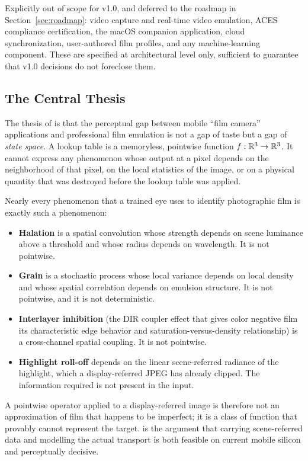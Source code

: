 Explicitly out of scope for v1.0, and deferred to the roadmap in
Section~\ref{sec:roadmap}: video capture and real-time video emulation, ACES
compliance certification, the macOS companion application, cloud
synchronization, user-authored film profiles, and any machine-learning
component. These are specified at architectural level only, sufficient to
guarantee that v1.0 decisions do not foreclose them.

\subsection{The Central Thesis}
\label{sec:intro-thesis}

The thesis of \EM{} is that the perceptual gap between mobile ``film camera''
applications and professional film emulation is not a gap of taste but a gap of
\emph{state space}. A lookup table is a memoryless, pointwise function
$f:\mathbb{R}^3 \to \mathbb{R}^3$. It cannot express any phenomenon whose output at a
pixel depends on the neighborhood of that pixel, on the local statistics of the
image, or on a physical quantity that was destroyed before the lookup table was
applied.

Nearly every phenomenon that a trained eye uses to identify photographic film
is exactly such a phenomenon:

\begin{itemize}
\item \textbf{Halation} is a spatial convolution whose strength depends on
scene luminance above a threshold and whose radius depends on wavelength. It is
not pointwise.
\item \textbf{Grain} is a stochastic process whose local variance depends on
local density and whose spatial correlation depends on emulsion structure. It
is not pointwise, and it is not deterministic.
\item \textbf{Interlayer inhibition} (the DIR coupler effect that gives color
negative film its characteristic edge behavior and saturation-versus-density
relationship) is a cross-channel spatial coupling. It is not pointwise.
\item \textbf{Highlight roll-off} depends on the linear scene-referred
radiance of the highlight, which a display-referred JPEG has already clipped.
The information required is not present in the input.
\end{itemize}

A pointwise operator applied to a display-referred image is therefore not an
approximation of film that happens to be imperfect; it is a class of function
that provably cannot represent the target. \EM{} is the argument that carrying
scene-referred data and modelling the actual transport is both feasible on
current mobile silicon and perceptually decisive.

